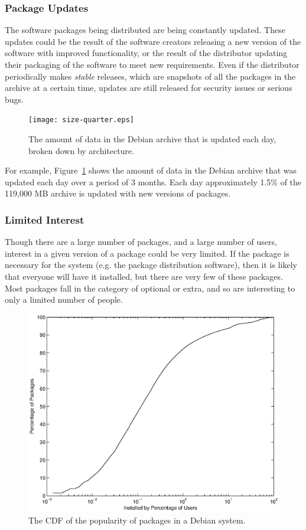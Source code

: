 \documentclass[conference]{IEEEtran}
\begin{document}
\subsubsection{Package Updates}

The software packages being distributed are being constantly
updated. These updates could be the result of the software creators
releasing a new version of the software with improved functionality,
or the result of the distributor updating their packaging of the
software to meet new requirements. Even if the distributor
periodically makes \emph{stable} releases, which are snapshots of
all the packages in the archive at a certain time, updates are still
released for security issues or serious bugs.

\begin{figure}
\centering
\texttt{[image: size-quarter.eps]}
\caption{The amount of data in the Debian archive that is updated
each day, broken down by architecture.}
\label{update_size}
\end{figure}

For example, Figure~\ref{update_size} shows the amount of data in
the Debian archive that was updated each day over a period of 3
months. Each day approximately 1.5\% of the 119,000 MB archive is
updated with new versions of packages.

\subsubsection{Limited Interest}

Though there are a large number of packages, and a large number of
users, interest in a given version of a package could be very
limited. If the package is necessary for the system (e.g. the
package distribution software), then it is likely that everyone will
have it installed, but there are very few of these packages. Most
packages fall in the category of optional or extra, and so are
interesting to only a limited number of people.

\begin{figure}
\centering
\includegraphics[width=\columnwidth]{apt_p2p_popularity-cdf.eps}
\caption{The CDF of the popularity of packages in a Debian system.}
\label{popularity_CDF}
\end{figure}
\end{document}
